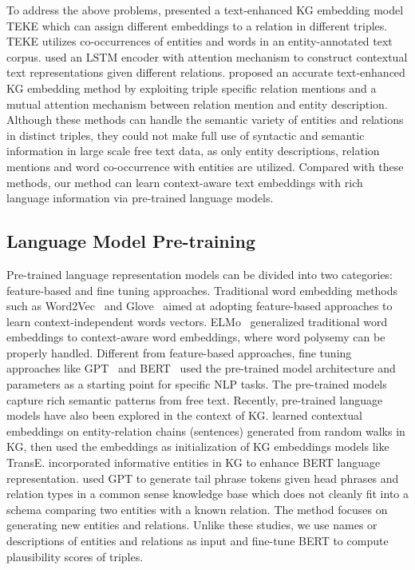 \documentclass[letterpaper]{article} \usepackage{aaai20}  \usepackage{times}  \usepackage{helvet} \usepackage{courier}  \usepackage[hyphens]{url}  \usepackage{graphicx} \urlstyle{rm} \def\UrlFont{\rm}  \usepackage{graphicx}  \usepackage{amsmath}
\begin{document}
To address the above problems, \cite{wang2016text} presented a text-enhanced KG embedding model TEKE which can assign different embeddings to a relation in different triples. TEKE utilizes co-occurrences of entities and words in an entity-annotated text corpus. \cite{xu2017knowledge} used an LSTM encoder with attention mechanism to construct contextual text representations given different relations. \cite{an2018accurate} proposed an accurate text-enhanced KG embedding method by exploiting triple specific relation mentions and a mutual attention mechanism between relation mention and entity description. Although these methods can handle the semantic variety of entities and relations in distinct triples, they could not make full use of syntactic and semantic information in large scale free text data, as only entity descriptions, relation mentions and word co-occurrence with entities are utilized. Compared with these methods, our method can learn context-aware text embeddings with rich language information via pre-trained language models.



\subsection{Language Model Pre-training}
Pre-trained language representation models can be divided into two categories: feature-based and fine tuning approaches. Traditional word embedding methods such as Word2Vec~\cite{mikolov2013distributed} and Glove~\cite{pennington2014glove} aimed at adopting feature-based approaches to learn context-independent words vectors. ELMo~\cite{peters2018deep} generalized traditional word embeddings to context-aware word embeddings, where word polysemy can be properly handled. Different from feature-based approaches, fine tuning approaches like GPT~\cite{radford2018improving} and BERT~\cite{devlin2019bert} used the pre-trained model architecture and parameters as a starting point for specific NLP tasks. The pre-trained models capture rich semantic patterns from free text. Recently, pre-trained language models have also been explored in the context of KG. \cite{wang2018dolores} learned contextual embeddings on entity-relation chains (sentences) generated from random walks in KG, then used the embeddings as initialization of KG embeddings models like TransE. \cite{zhang-etal-2019-ernie} incorporated informative entities in KG to enhance BERT language representation. \cite{bosselut-etal-2019-comet} used GPT to generate tail phrase tokens given head phrases and relation types in a common sense knowledge base which does not cleanly fit into a schema comparing two entities with a known relation. The method focuses on generating new entities and relations. Unlike these studies, we use names or descriptions of entities and relations as input and fine-tune BERT to compute plausibility scores of triples.
\end{document}
